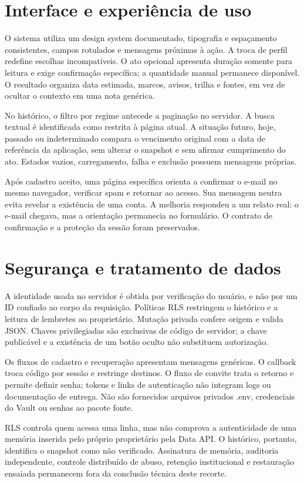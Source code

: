 \section{Interface e experiência de uso}
\label{section-4-7}
O sistema utiliza um design system documentado, tipografia e espaçamento consistentes, campos rotulados e mensagens próximas à ação. A troca de perfil redefine escolhas incompatíveis. O ato opcional apresenta duração somente para leitura e exige confirmação específica; a quantidade manual permanece disponível. O resultado organiza data estimada, marcos, avisos, trilha e fontes, em vez de ocultar o contexto em uma nota genérica.

No histórico, o filtro por regime antecede a paginação no servidor. A busca textual é identificada como restrita à página atual. A situação futuro, hoje, passado ou indeterminado compara o vencimento original com a data de referência da aplicação, sem alterar o snapshot e sem afirmar cumprimento do ato. Estados vazios, carregamento, falha e exclusão possuem mensagens próprias.

Após cadastro aceito, uma página específica orienta a confirmar o e-mail no mesmo navegador, verificar spam e retornar ao acesso. Sua mensagem neutra evita revelar a existência de uma conta. A melhoria respondeu a um relato real: o e-mail chegava, mas a orientação permanecia no formulário. O contrato de confirmação e a proteção da sessão foram preservados.

\section{Segurança e tratamento de dados}
\label{section-4-8}
A identidade usada no servidor é obtida por verificação do usuário, e não por um ID confiado ao corpo da requisição. Políticas RLS restringem o histórico e a leitura de lembretes ao proprietário. Mutação privada confere origem e valida JSON. Chaves privilegiadas são exclusivas de código de servidor; a chave publicável e a existência de um botão oculto não substituem autorização.

Os fluxos de cadastro e recuperação apresentam mensagens genéricas. O callback troca código por sessão e restringe destinos. O fluxo de convite trata o retorno e permite definir senha; tokens e links de autenticação não integram logs ou documentação de entrega. Não são fornecidos arquivos privados .env, credenciais do Vault ou senhas ao pacote fonte.

RLS controla quem acessa uma linha, mas não comprova a autenticidade de uma memória inserida pelo próprio proprietário pela Data API. O histórico, portanto, identifica o snapshot como não verificado. Assinatura de memória, auditoria independente, controle distribuído de abuso, retenção institucional e restauração ensaiada permanecem fora da conclusão técnica deste recorte.
